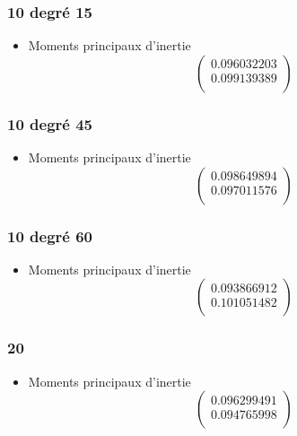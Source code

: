 \documentclass[a4paper,12pt]{report}
\begin{document}
\subsubsection*{10 degré 15}
\begin{itemize}

\item Moments principaux d'inertie
\[
   \left (
   \begin{array}{c}
      0.096032203 \\
      0.099139389 \\
   \end{array}
   \right )
\]

\end{itemize}

\subsubsection*{10 degré 45}
\begin{itemize}

\item Moments principaux d'inertie
\[
   \left (
   \begin{array}{c}
      0.098649894 \\
      0.097011576 \\
   \end{array}
   \right )
\]

\end{itemize}

\subsubsection*{10 degré 60}
\begin{itemize}
\item Moments principaux d'inertie
\[
   \left (
   \begin{array}{c}
      0.093866912 \\
      0.101051482 \\
   \end{array}
   \right )
\]

\end{itemize}

\subsubsection*{20 }
\begin{itemize}
\item Moments principaux d'inertie
\[
   \left (
   \begin{array}{c}
      0.096299491 \\
      0.094765998 \\
   \end{array}
   \right )
\]

\end{itemize}
\end{document}
